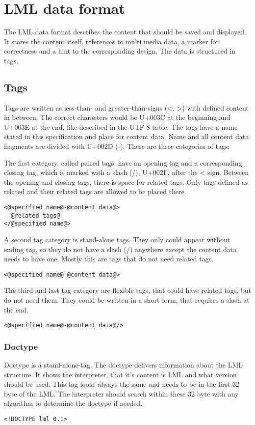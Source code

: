 \documentclass[12pt,a4paper]{article}
\begin{document}
\newpage
\section{LML data format}
The LML data format describes the content that should be saved and displayed. It stores the content itself, references to multi media data, a marker for correctness and a hint to the corresponding design. The data is structured in tags.

\subsection{Tags}
Tags are written as less-than- and greater-than-signs (<, >) with defined content in between. The correct characters would be  U+003C at the beginning and U+003E at the end, like described in the UTF-8 table. The tags have a name stated in this specification and place for content data. Name and all content data fragments are divided with U+002D (-). There are three categories of tags:

The first category, called paired tags, have an opening tag and a corresponding closing tag, which is marked with a slash (/), U+002F, after the < sign. Between the opening and closing tags, there is space for related tags. Only tags defined as related and their related tags are allowed to be placed there.
\begin{lstlisting}[frame=single,style=base]
<@specified name@-@content data@>
  @related tags@
</@specified name@>
\end{lstlisting}

A second tag category is stand-alone tags. They only could appear without ending tag, so they do not have a slash (/) anywhere except the content data needs to have one. Mostly this are tags that do not need related tags.
\begin{lstlisting}[frame=single,style=base]
<@specified name@-@content data@>
\end{lstlisting}

The third and last tag category are flexible tags, that could have related tags, but do not need them. They could be written in a short form, that requires a slash at the end.
\begin{lstlisting}[frame=single,style=base]
<@specified name@-@content data@/>
\end{lstlisting}

\subsubsection*{Doctype}
Doctype is a stand-alone-tag. The doctype delivers information about the LML structure. It shows the interpreter, that it's content is LML and what version should be used. This tag looks always the same and needs to be in the first 32 byte of the LML. The interpreter should search within these 32 byte with any algorithm to determine the doctype if needed.
\begin{lstlisting}[frame=single,style=base]
<!DOCTYPE lml 0.1>
\end{lstlisting}
\end{document}
